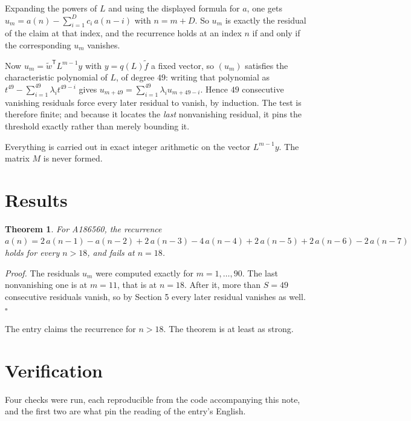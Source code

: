 \documentclass[11pt]{article}
\newtheorem{theorem}{Theorem}
\theoremstyle{definition}
\begin{document}
Expanding the powers of $L$ and using the displayed formula for $a$, one gets $u_m = a(n) - \sum_{i=1}^{D} c_i\,a(n-i)$ with $n = m + D$. So $u_m$ is exactly the residual of the claim at that index, and the recurrence holds at an index $n$ if and only if the corresponding $u_m$ vanishes.

Now $u_m = \tilde w^{\mathsf T} L^{m-1} y$ with $y = q(L)\tilde f$ a fixed vector, so $(u_m)$ satisfies the characteristic polynomial of $L$, of degree $49$: writing that polynomial as $t^{49} - \sum_{i=1}^{49} \lambda_i t^{49-i}$ gives $u_{m+49} = \sum_{i=1}^{49} \lambda_i u_{m+49-i}$. Hence $49$ consecutive vanishing residuals force every later residual to vanish, by induction. The test is therefore finite; and because it locates the {\itshape last} nonvanishing residual, it pins the threshold exactly rather than merely bounding it.

Everything is carried out in exact integer arithmetic on the vector $L^{m-1}y$. The matrix $M$ is never formed.

\section{Results}

\begin{theorem} For A186560, the recurrence $a(n) = 2\,a(n-1) - a(n-2) + 2\,a(n-3) - 4\,a(n-4) + 2\,a(n-5) + 2\,a(n-6) - 2\,a(n-7)$ holds for every $n > 18$, and fails at $n = 18$.\end{theorem}

{\itshape Proof.} The residuals $u_m$ were computed exactly for $m = 1,\dots,90$. The last nonvanishing one is at $m = 11$, that is at $n = 18$. After it, more than $S = 49$ consecutive residuals vanish, so by Section 5 every later residual vanishes as well. $\square$

The entry claims the recurrence for $n > 18$. The theorem is at least as strong.

\section{Verification}

Four checks were run, each reproducible from the code accompanying this note, and the first two are what pin the reading of the entry's English.
\end{document}
